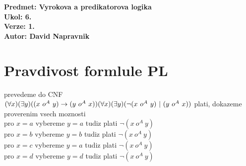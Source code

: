 \documentclass[a4paper]{article}
\begin{document}
\noindent
\textbf{Predmet: Vyrokova a predikatorova logika}\\
\textbf{Ukol: 6.}\\
\textbf{Verze: 1.}\\
\textbf{Autor: David Napravnik}

\section*{Pravdivost formlule PL}
prevedeme do CNF\\$
(\forall x)(\exists y)((x~o^A~y) \rightarrow (y~o^A~x))\\
(\forall x)(\exists y)(\neg(x~o^A~y)  ~|~ (y~o^A~x))\\
$
plati, dokazeme proverenim vsech moznosti\\
pro $x=a$ vybereme $y=a$ tudiz plati $\neg(x~o^A~y)$\\
pro $x=b$ vybereme $y=b$ tudiz plati $\neg(x~o^A~y)$\\
pro $x=c$ vybereme $y=a$ tudiz plati $\neg(x~o^A~y)$\\
pro $x=d$ vybereme $y=d$ tudiz plati $\neg(x~o^A~y)$\\
\end{document}
